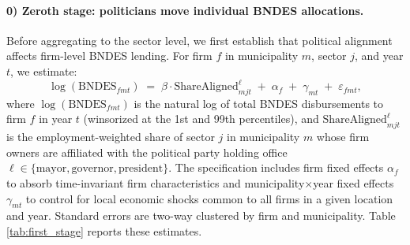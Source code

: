 \documentclass{article}
\begin{document}
\paragraph{0) Zeroth stage: politicians move individual BNDES allocations.}
Before aggregating to the sector level, we first establish that political alignment affects firm-level BNDES lending. For firm $f$ in municipality $m$, sector $j$, and year $t$, we estimate:
\begin{equation}
    \label{eq:zerothstage}
    \log(\text{BNDES}_{fmt}) \;=\; \beta \cdot \text{ShareAligned}^{\ell}_{mjt} \;+\; \alpha_f \;+\; \gamma_{mt} \;+\; \varepsilon_{fmt},
\end{equation}
where $\log(\text{BNDES}_{fmt})$ is the natural log of total BNDES disbursements to firm $f$ in year $t$ (winsorized at the 1st and 99th percentiles), and $\text{ShareAligned}^{\ell}_{mjt}$ is the employment-weighted share of sector $j$ in municipality $m$ whose firm owners are affiliated with the political party holding office $\ell \in \{\text{mayor}, \text{governor}, \text{president}\}$. The specification includes firm fixed effects $\alpha_f$ to absorb time-invariant firm characteristics and municipality$\times$year fixed effects $\gamma_{mt}$ to control for local economic shocks common to all firms in a given location and year. Standard errors are two-way clustered by firm and municipality. Table \ref{tab:first_stage} reports these estimates.

\end{document}
